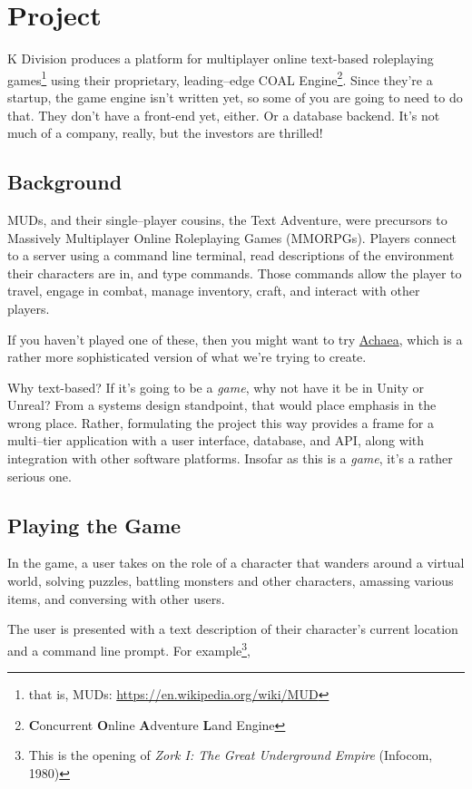 \documentclass{article}
\newcommand{\enterProblemHeader}[1]{
}
\newcommand{\exitProblemHeader}[1]{
\nobreak\extramarks{#1}{}\nobreak
}
\newcounter{homeworkProblemCounter} %
\newcommand{\homeworkProblemName}{}
\newenvironment{homeworkProblem}[1][Problem \arabic{homeworkProblemCounter}]{ %
\stepcounter{homeworkProblemCounter} %
\renewcommand{\homeworkProblemName}{#1} %
\section{\homeworkProblemName} %
\enterProblemHeader{\homeworkProblemName} %
}{
\exitProblemHeader{\homeworkProblemName} %
}
\newcommand{\homeworkSectionName}{}
\newenvironment{homeworkSection}[1]{ %
\renewcommand{\homeworkSectionName}{#1} %
\subsection{\homeworkSectionName} %
\enterProblemHeader{\homeworkProblemName\ [\homeworkSectionName]} %
}{
\enterProblemHeader{\homeworkProblemName} %
}
\begin{document}
\begin{homeworkProblem}[Project]

  K Division produces a platform for multiplayer online text-based roleplaying games\footnote{that is, MUDs: \url{https://en.wikipedia.org/wiki/MUD}} using their proprietary, leading--edge COAL Engine\footnote{\textbf{C}oncurrent \textbf{O}nline \textbf{A}dventure \textbf{L}and Engine}. Since they're a startup, the game engine isn't written yet, so some of you are going to need to do that. They don't have a front-end yet, either. Or a database backend. It's not much of a company, really, but the investors are thrilled!


\begin{homeworkSection}{Background}
	MUDs, and their single--player cousins, the Text Adventure, were precursors to Massively Multiplayer Online Roleplaying Games (MMORPGs). Players connect to a server using a command line terminal, read descriptions of the environment their characters are in, and type commands. Those commands allow the player to travel, engage in combat, manage inventory, craft, and interact with other players.
	
	If you haven't played one of these, then you might want to try \href{https://play.achaea.com/}{Achaea}, which is a rather more sophisticated version of what we're trying to create.

	Why text-based? If it's going to be a \textit{game}, why not have it be in Unity or Unreal? From a systems design standpoint, that would place emphasis in the wrong place. Rather, formulating the project this way provides a frame for a multi--tier application with a user interface, database, and API, along with integration with other software platforms. Insofar as this is a \textit{game}, it's a rather serious one.
\end{homeworkSection}

\begin{homeworkSection}{Playing the Game}
	In the game, a user takes on the role of a character that wanders around a virtual world, solving puzzles, battling monsters and other characters, amassing various items, and conversing with other users.
	
	The user is presented with a text description of their character's current location and a command line prompt. For example\footnote{This is the opening of \textit{Zork I: The Great Underground Empire} (Infocom, 1980)},


\end{homeworkSection}
\end{homeworkProblem}
\end{document}
